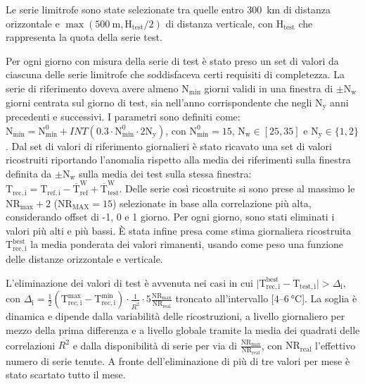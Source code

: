Le serie limitrofe sono state selezionate tra quelle entro \qty{300}{\kilo\meter} di distanza orizzontale e \(\max(\qty{500}{\meter}, \mathrm{H_{test}}/2)\) di distanza verticale, con \(\mathrm{H_{test}}\) che rappresenta la quota della serie test.

Per ogni giorno con misura della serie di test è stato preso un set di valori da ciascuna delle serie limitrofe che soddisfaceva certi requisiti di completezza. La serie di riferimento doveva avere almeno \(\mathrm{N_{\min}}\) giorni validi in una finestra di \(\pm\mathrm{N_w}\) giorni centrata sul giorno di test, sia nell'anno corrispondente che negli \(\mathrm{N_y}\) anni precedenti e successivi. I parametri sono definiti come: \(\mathrm{N_{\min}} = \mathrm{N^0_{\min}} + INT(0.3\cdot\mathrm{N^0_{\min}}\cdot2\mathrm{N_y})\), con \(\mathrm{N^0_{\min}} = 15\), \(\mathrm{N_w} \in [25, 35]\) e \(\mathrm{N_y} \in \{1, 2\} \). Dal set di valori di riferimento giornalieri  è stato ricavato una set di valori ricostruiti riportando l'anomalia rispetto alla media dei riferimenti sulla finestra definita da \(\pm \mathrm{N_w}\) sulla media dei test sulla stessa finestra: \(\mathrm{T_{rec,i}} = \mathrm{T_{ref,i}} - \mathrm{\overline{T}_{ref}^W} + \mathrm{\overline{T}_{test}^W}\). Delle serie così ricostruite si sono prese al massimo le \(\mathrm{NR_{\max}} + 2\) (\(\mathrm{NR_{MAX}} = 15\)) selezionate in base alla correlazione più alta, considerando offset di -1, 0 e 1 giorno. Per ogni giorno, sono stati eliminati i valori più alti e più bassi. È stata infine presa come stima giornaliera ricostruita \(\mathrm{T_{rec,i}^{best}}\) la media ponderata dei valori rimanenti, usando come peso una funzione delle distanze orizzontale e verticale.

L'eliminazione dei valori di test è avvenuta nei casi in cui \(\lvert \mathrm{T_{rec,i}^{best}} - \mathrm{T_{test,i}} \rvert > \Delta_\mathrm{i}\), con \(\Delta_\mathrm{i} = \frac{1}{2}(\mathrm{T_{rec,i}^{\max} - T_{rec,i}^{\min}})\cdot\frac{1}{\overline{R^2}}\cdot5\frac{\mathrm{NR_{\max}}}{\mathrm{NR_{real}}}\) troncato all'intervallo [\(\num{4}\)--\(\qty{6}{\degreeCelsius}\)]. La soglia è dinamica e dipende dalla variabilità delle ricostruzioni, a livello giornaliero per mezzo della prima differenza e a livello globale tramite la media dei quadrati delle correlazioni \(\overline{R^2}\) e dalla disponibilità di serie per via di \(\frac{\mathrm{NR_{\max}}}{\mathrm{NR_{real}}}\), con \(\mathrm{NR_{real}}\) l'effettivo numero di serie tenute. A fronte dell'eliminazione di più di tre valori per mese è stato scartato tutto il mese.